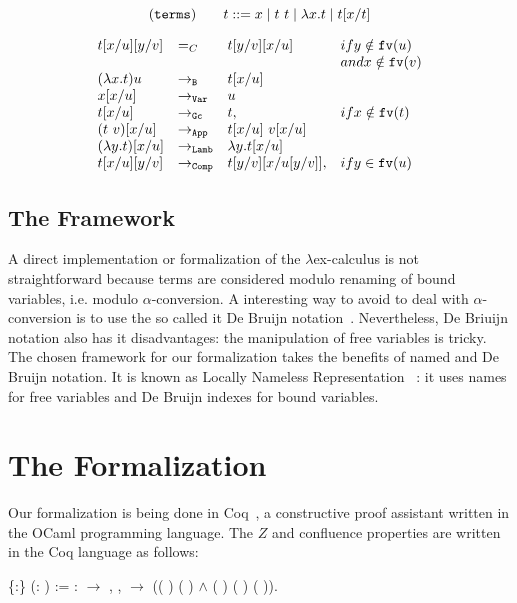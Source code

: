 \documentclass[conference]{IEEEtran}
\newcommand{\fv}[1]{{\tt fv}(#1)}
\begin{document}
$$\mbox{\tt (terms)}\;\;\;\;\;\;\; t ::= x \mid t\ t \mid \lambda x.t \mid t[x/t]$$

$$\begin{array}{llll}
    t[x/u][y/v] & =_C & t[y/v][x/u] & \mbox{if } y\notin \fv{u} \\
                &&& \mbox{and } x\notin \fv{v} \\
    (\lambda x.t) u & \to_{\tt B} & t[x/u] & \\
    x[x/u] & \to_{\tt Var} & u & \\      
    t[x/u] & \to_{\tt Gc} & t, & \mbox{ if } x \notin\fv{t} \\      
    (t\ v)[x/u] & \to_{\tt App} & t[x/u]\ v[x/u] & \\
    (\lambda y. t)[x/u] & \to_{\tt Lamb} & \lambda y.t[x/u] & \\
    t[x/u][y/v] & \to_{\tt Comp} & t[y/v][x/u[y/v]], & \mbox{ if } y \in\fv{u}            
  \end{array}$$
  
  \subsection{The Framework}

  A direct implementation or formalization of the $\lambda$ex-calculus
  is not straightforward because terms are considered modulo renaming
  of bound variables, i.e. modulo $\alpha$-conversion. A interesting
  way to avoid to deal with $\alpha$-conversion is to use the so
  called {it De Bruijn}
  notation~\cite{bruijn72:_lambd_churc_rosser}. Nevertheless, De
  Briuijn notation also has it disadvantages: the manipulation of free
  variables is tricky. The chosen framework for our formalization
  takes the benefits of named and De Bruijn notation. It is known as
  Locally Nameless Representation ~\cite{Ch11}: it uses names for free
  variables and De Bruijn indexes for bound variables.

\section{The Formalization}
  
Our formalization is being done in Coq~\cite{CoqTeam}, a constructive
proof assistant written in the OCaml programming language. The
$Z$ and confluence properties are written in the Coq language as follows:

\begin{coqdoccode}
  \coqdocnoindent {}
   \{:\}
  (:  ) :=
  \coqdoctac{\ensuremath{\exists}} :
  \ensuremath{\rightarrow} ,
  \coqdockw{\ensuremath{\forall}}  ,
     \ensuremath{\rightarrow}
  (( ) 
  ( ) \ensuremath{\land}
  ( ) (
  ) ( )).\coqdoceol
\end{coqdoccode}
\end{document}
